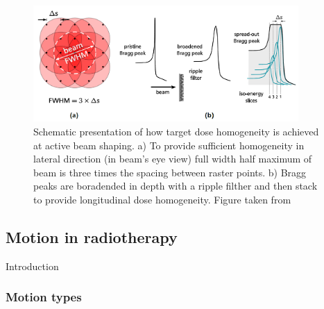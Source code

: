 \documentclass[type=dr, dr=rernat, accentcolor=tud7b,colorbacktitle, bigchapter, openright, twoside, 12pt ]{tudthesis}
\begin{document}
\begin{figure}[H]
\begin{center}
\includegraphics[width=0.9\textwidth]{./Images/active.png}
\caption{Schematic presentation of how target dose homogeneity is achieved at active beam shaping. a) To provide sufficient homogeneity in lateral direction (in beam's eye view) full width
half maximum of beam is three times the spacing between raster points. b) Bragg peaks are boradended in depth with a ripple filther and then stack to provide longitudinal dose homogeneity. 
Figure taken from \cite{Richter2012}}
\label{active}
\end{center}
\end{figure}


\newpage

\subsection{Motion in radiotherapy}
\label{sec:motion}

Introduction


\subsubsection{Motion types}
\end{document}
